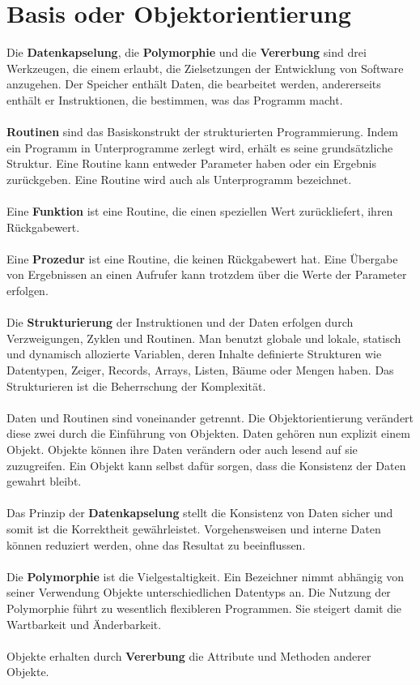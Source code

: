 \section{Basis oder Objektorientierung}
Die \textbf{Datenkapselung}, die \textbf{Polymorphie} und die \textbf{Vererbung} sind drei Werkzeugen, die einem erlaubt, die Zielsetzungen der Entwicklung von Software anzugehen. Der Speicher enthält Daten, die bearbeitet werden, andererseits enthält er Instruktionen, die bestimmen, was das Programm macht.
\\\\
\textbf{Routinen} sind das Basiskonstrukt der strukturierten Programmierung. Indem ein Programm in Unterprogramme zerlegt wird, erhält es seine grundsätzliche Struktur. Eine Routine kann entweder Parameter haben oder ein Ergebnis zurückgeben. Eine Routine wird auch als Unterprogramm bezeichnet.
\\\\
Eine \textbf{Funktion} ist eine Routine, die einen speziellen Wert zurückliefert, ihren Rückgabewert. 
\\\\
Eine \textbf{Prozedur} ist eine Routine, die keinen Rückgabewert hat. Eine Übergabe von Ergebnissen an einen Aufrufer kann trotzdem über die Werte der Parameter erfolgen.
\\\\
Die \textbf{Strukturierung} der Instruktionen und der Daten erfolgen durch Verzweigungen, Zyklen und Routinen. Man benutzt globale und lokale, statisch und dynamisch allozierte Variablen, deren Inhalte definierte Strukturen wie Datentypen, Zeiger, Records, Arrays, Listen, Bäume oder Mengen haben. Das Strukturieren ist die Beherrschung der Komplexität.
\\\\
Daten und Routinen sind voneinander getrennt. Die Objektorientierung verändert diese zwei durch die Einführung von Objekten. Daten gehören nun explizit einem Objekt. Objekte können ihre Daten verändern oder auch lesend auf sie zuzugreifen. Ein Objekt kann selbst dafür sorgen, dass die Konsistenz der Daten gewahrt bleibt.
\\\\
Das Prinzip der \textbf{Datenkapselung} stellt die Konsistenz von Daten sicher und somit ist die Korrektheit gewährleistet. Vorgehensweisen und interne Daten können reduziert werden, ohne das Resultat zu beeinflussen.
\\\\
Die \textbf{Polymorphie} ist die Vielgestaltigkeit. Ein Bezeichner nimmt abhängig von seiner Verwendung Objekte unterschiedlichen Datentyps an. Die Nutzung der Polymorphie führt zu wesentlich flexibleren Programmen. Sie steigert damit die Wartbarkeit und Änderbarkeit.
\\\\
Objekte erhalten durch \textbf{Vererbung} die Attribute und Methoden anderer Objekte. 
